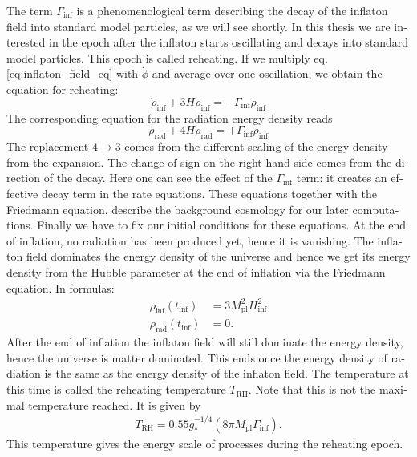 \documentclass[master,       %
               twoside,        %
               BCOR10mm,       %
               english,ngerman, %
               ]{GAUBM}
\begin{document}
\begin{otherlanguage}{english}
The term $\Gamma_\mathrm{inf}$ is a phenomenological term describing the decay of the inflaton field into standard model particles, as we will see shortly. In this thesis we are interested in the epoch after the inflaton starts oscillating and decays into standard model particles. This epoch is called reheating.
If we multiply eq. \eqref{eq:inflaton_field_eq} with $\dot{\phi}$ and average over one oscillation, we obtain
the equation for reheating:
\begin{equation}
	\label{eq:cont_eq_inf}
	\boxed{
	\dot{\rho}_\mathrm{inf} + 3 H \rho_\mathrm{inf} = - \Gamma_\mathrm{inf} \rho_\mathrm{inf}
	}
\end{equation}
The corresponding equation for the radiation energy density reads
\begin{equation}
	\label{eq:cont_eq_rad}
	\boxed{
	\dot{\rho}_\mathrm{rad} + 4 H \rho_\mathrm{rad} = + \Gamma_\mathrm{inf} \rho_\mathrm{inf}
	}
\end{equation}
The replacement $4 \to 3$ comes from the different scaling of the energy density from the expansion. The change of sign on the right-hand-side comes from the direction of the decay. Here one can see the effect of the $\Gamma_{\mathrm{inf}}$ term: it creates an effective decay term in the rate equations.
These equations together with the Friedmann equation, describe the background cosmology for our later computations.
Finally we have to fix our initial conditions for these equations.
At the end of inflation, no radiation has been produced yet, hence it is vanishing.
The inflaton field dominates the energy density of the universe and hence we get its energy density from the Hubble parameter at the end of inflation via the Friedmann equation.
In formulas:
\begin{align}
	\rho_\mathrm{inf}(t_\mathrm{inf}) &= 3 M_\mathrm{pl}^2 H_\mathrm{inf}^2 \nonumber \\
	\rho_\mathrm{rad}(t_\mathrm{inf}) &= 0.
\end{align}
After the end of inflation the inflaton field will still dominate the energy density, hence the universe is matter dominated. This ends once the energy density of radiation is the same as the energy density of the inflaton field.
The temperature at this time is called the reheating temperature $T_\mathrm{RH}$.
Note that this is not the maximal temperature reached.
It is given by \cite[eq. 8.34]{the_early_universe_kolb_and_turner}
\begin{align}
	T_\mathrm{RH} = 0.55 g_*^{-1/4} (8 \pi M_\mathrm{pl}  \Gamma_\mathrm{inf}).
\end{align}
This temperature gives the energy scale of processes during the reheating epoch.



\end{otherlanguage}
\end{document}
